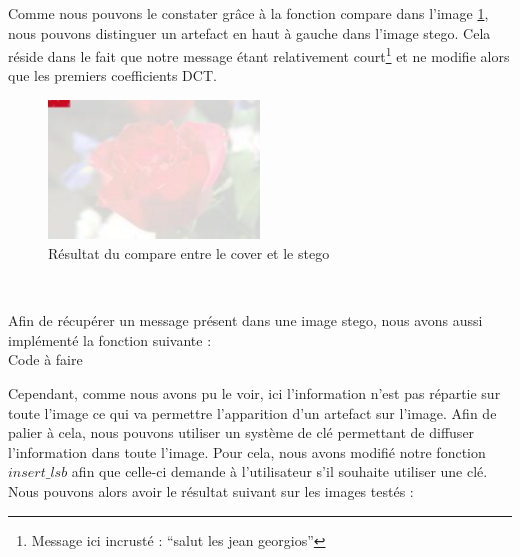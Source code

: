 Comme nous pouvons le constater grâce à la fonction compare dans l'image \ref{img:10}, nous pouvons distinguer un artefact en haut à gauche dans l'image stego. Cela réside dans le fait que notre message étant relativement court\footnote{Message ici incrusté : \enquote{salut les jean georgios}} et ne modifie alors que les premiers coefficients DCT.
\begin{figure}[H]
    \centering
    \includegraphics[width=0.5\textwidth]{img/test.jpg}
    \caption{Résultat du compare entre le cover et le stego}
    \label{img:10}
\end{figure}
~\\\par
Afin de récupérer un message présent dans une image stego, nous avons aussi implémenté la fonction suivante :\\
 Code à faire
~\\\par
Cependant, comme nous avons pu le voir, ici l'information n'est pas répartie sur toute l'image ce qui va permettre l'apparition d'un artefact sur l'image. Afin de palier à cela, nous pouvons utiliser un système de clé permettant de diffuser l'information dans toute l'image. Pour cela, nous avons modifié notre fonction $insert\_lsb$ afin que celle-ci demande à l'utilisateur s'il souhaite utiliser une clé.\\
Nous pouvons alors avoir le résultat suivant sur les images testés :
